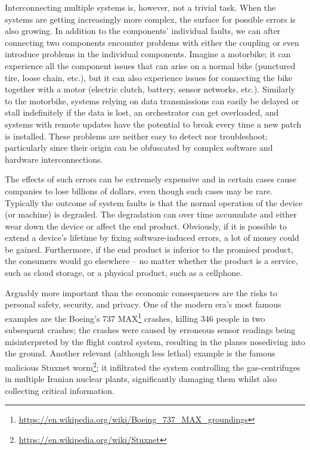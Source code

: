 
Interconnecting multiple systems is, however, not a trivial task.
When the systems are getting increasingly more complex, the surface for possible errors is also growing.
In addition to the components' individual faults, we can after connecting two components encounter problems with either the coupling or even introduce problems in the individual components.
Imagine a motorbike; it can experience all the component issues that can arise on a normal bike (punctured tire, loose chain, etc.), but it can also experience issues for connecting the bike together with a motor (electric clutch, battery, sensor networks, etc.).
Similarly to the motorbike, systems relying on data transmissions can easily be delayed or stall indefinitely if the data is lost, an orchestrator can get overloaded, and systems with remote updates have the potential to break every time a new patch is installed.
These problems are neither easy to detect nor troubleshoot; particularly since their origin can be obfuscated by complex software and hardware interconnections.

The effects of such errors can be extremely expensive and in certain cases cause companies to lose billions of dollars, even though such cases may be rare.
Typically the outcome of system faults is that the normal operation of the device (or machine) is degraded.
The degradation can over time accumulate and either wear down the device or affect the end product.
Obviously, if it is possible to extend a device's lifetime by fixing software-induced errors, a lot of money could be gained.
Furthermore, if the end product is inferior to the promised product, the consumers would go elsewhere -- no matter whether the product is a service, such as cloud storage, or a physical product, such as a cellphone.

Arguably more important than the economic consequences are the risks to personal safety, security, and privacy.
One of the modern era's most famous examples are the Boeing's 737 MAX\footnote{\url{https://en.wikipedia.org/wiki/Boeing_737_MAX_groundings}} crashes, killing 346 people in two subsequent crashes; the crashes were caused by erroneous sensor readings being misinterpreted by the flight control system, resulting in the planes nosediving into the ground.
Another relevant (although less lethal) example is the famous malicious Stuxnet worm\footnote{\url{https://en.wikipedia.org/wiki/Stuxnet}}; it infiltrated the system controlling the gas-centrifuges in multiple Iranian nuclear plants, significantly damaging them whilst also collecting critical information. 


